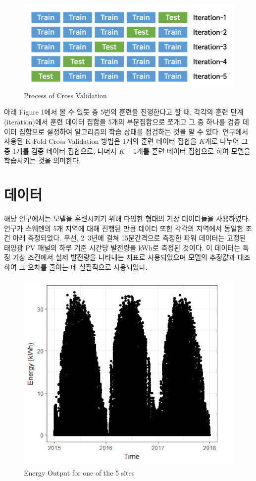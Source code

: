 \documentclass{article}
\begin{document}
\begin{figure}[h]
\centering
\includegraphics[scale=0.5]{./fig/Figure_1.png}
\caption{Process of Cross Validation}
\label{fig_1}
\end{figure}

아래 Figure 1에서 볼 수 있듯 총 5번의 훈련을 진행한다고 할 때, 각각의 훈련 단계(iteration)에서 훈련 데이터 집합을 5개의 부분집합으로 쪼개고 그 중 하나를 검증 데이터 집합으로 설정하여 알고리즘의 학습 상태를 점검하는 것을 알 수 있다. 연구에서 사용된 K-Fold Cross Validation 방법은 1개의 훈련 데이터 집합을 $K$개로 나누어 그 중 1개를 검증 데이터 집합으로, 나머지 $K-1$개를 훈련 데이터 집합으로 하여 모델을 학습시키는 것을 의미한다.

\section{데이터}
해당 연구에서는 모델을 훈련시키기 위해 다양한 형태의 기상 데이터들을 사용하였다. 연구가 스웨덴의 5개 지역에 대해 진행된 만큼 데이터 또한 각각의 지역에서 동일한 조건 아래 측정되었다. 우선, 2~3년에 걸쳐 15분간격으로 측정한 파워 데이터는 고정된 태양광 PV 패널의 하루 기준 시간당 발전량을 kWh로 측정된 것이다. 이 데이터는 특정 기상 조건에서 실제 발전량을 나타내는 지표로 사용되었으며 모델의 추정값과 대조하여 그 오차를 줄이는 데 실질적으로 사용되었다.

\begin{figure}[h]
\centering
\includegraphics[scale=0.20]{./fig/Figure_2.png}
\caption{Energy Output for one of the 5 sites}
\label{fig_2}
\end{figure}
\end{document}
